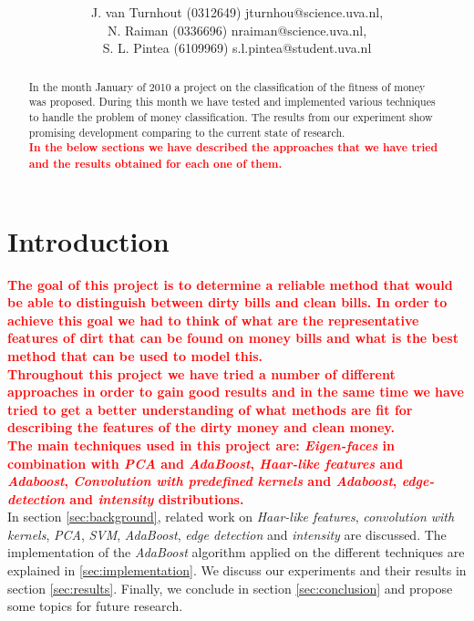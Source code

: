 \documentclass[11pt,twocolumn]{article}
\title{\tbf{Dirty Money:}\\\tbf{Feature selection using AdaBoost}}
\author{J. van Turnhout (0312649) jturnhou@science.uva.nl, \\ N. Raiman (0336696) nraiman@science.uva.nl, \\ S. L. Pintea (6109969) s.l.pintea@student.uva.nl}
\newcommand{\todo}[1]{\textcolor{red}{\textbf{#1}}}
\begin{document}
	\maketitle
	\begin{abstract}
	\hspace*{10px}In the month January of 2010 a project on the classification of the fitness of money was proposed. During this month we have tested and implemented various techniques to handle the problem of money classification. The results from our experiment show promising development comparing to the current state of research.\\
	\todo{\hspace*{10px}In the below sections we have described the approaches that we have tried and the results obtained for each one of them.}
	\end{abstract}
	\section{Introduction}
		\todo{\hspace*{10px}The goal of this project is to determine a reliable method that would be able to distinguish between dirty bills and clean bills. In order to achieve this goal we had to think of what are the representative features of dirt that can be found on money bills and what is the best method that can be used to model this.\\} 
		\todo{\hspace*{10px}Throughout this project we have tried a number of different approaches in order to gain good results and in the same time we have tried to get a better understanding of what methods are fit for describing the features of the dirty money and clean money.\\}
		\todo{\hspace*{10px}The main techniques used in this project are: \emph{Eigen-faces} in combination with \emph{PCA} and \emph{AdaBoost}, \emph{Haar-like features} and \emph{Adaboost}, \emph{Convolution with predefined kernels} and \emph{Adaboost}, \emph{edge-detection} and \emph{intensity} distributions.\\}
		\hspace*{10px}In section \ref{sec:background}, related work on \emph{Haar-like features}, \emph{convolution with kernels}, \emph{PCA}, \emph{SVM}, \emph{AdaBoost}, \emph{edge detection} and \emph{intensity} are discussed. The implementation of the \emph{AdaBoost} algorithm applied on the different techniques are explained in \ref{sec:implementation}. We discuss our experiments and their results in section \ref{sec:results}. Finally, we conclude in section \ref{sec:conclusion} and propose some topics for future research.
\end{document}
